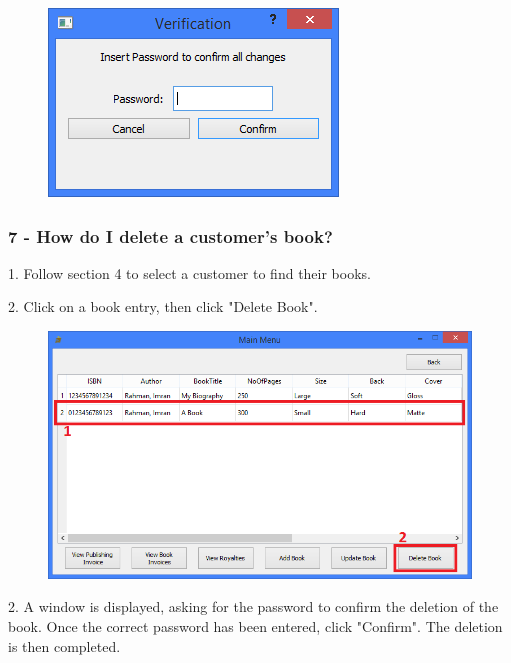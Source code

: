 \begin{figure}[H]
    \includegraphics[width=\textwidth]{./Manual/Tutorial/Q6/Verification.png}
\end{figure}

\subsubsection{7 -  How do I delete a customer's book?}

1. Follow section 4 to select a customer to find their books.

2. Click on a book entry, then click "Delete Book".

\begin{figure}[H]
    \includegraphics[width=\textwidth]{./Manual/Tutorial/Q7/DeleteBook.png}
\end{figure}

2. A window is displayed, asking for the password to confirm the deletion of the book. Once the correct password has been entered, click "Confirm". The deletion is then completed.

